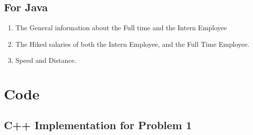 \documentclass[11pt]{article}
\begin{document}
\subsection*{For Java}
\begin{enumerate}
	\item The General information about the Full time and the Intern Employee
	\item The Hiked salaries of both the Intern Employee, and the Full Time Employee.
	\item Speed and Distance.
\end{enumerate}


\section{Code}

\subsection{C++ Implementation for Problem 1}


\end{document}
